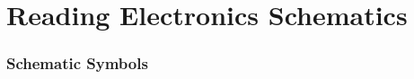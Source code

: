 \documentclass[11pt]{article}
\begin{document}




  


\clearpage
\appendix

\section{Reading Electronics Schematics}
\label{sec:schematics}

\subsubsection*{Schematic Symbols}
\end{document}
